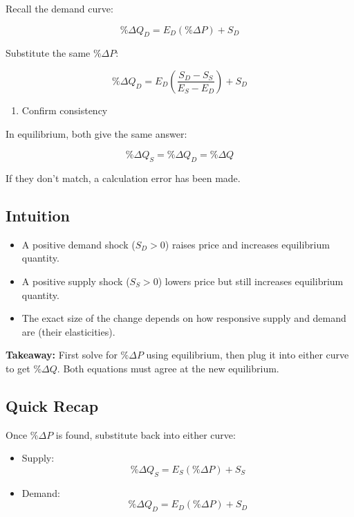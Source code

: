 \documentclass[
  letterpaper,
  DIV=11,
  numbers=noendperiod]{scrartcl}
\providecommand{\tightlist}{%
  \setlength{\itemsep}{0pt}\setlength{\parskip}{0pt}}
\begin{document}
Recall the demand curve:

\[
\% \Delta Q_D = E_D (\% \Delta P) + S_D
\]

Substitute the same \(\% \Delta P\):

\[
\% \Delta Q_D = E_D \left( \frac{S_D - S_S}{E_S - E_D} \right) + S_D
\]

\begin{enumerate}
\def\labelenumi{\arabic{enumi}.}
\setcounter{enumi}{2}
\tightlist
\item
  Confirm consistency
\end{enumerate}

In equilibrium, both give the same answer:

\[
\% \Delta Q_S = \% \Delta Q_D = \% \Delta Q
\]

If they don't match, a calculation error has been made.

\subsection{Intuition}\label{intuition-1}

\begin{itemize}
\tightlist
\item
  A positive demand shock (\(S_D > 0\)) raises price and increases
  equilibrium quantity.\\
\item
  A positive supply shock (\(S_S > 0\)) lowers price but still increases
  equilibrium quantity.\\
\item
  The exact size of the change depends on how responsive supply and
  demand are (their elasticities).
\end{itemize}

\textbf{Takeaway:} First solve for \(\% \Delta P\) using equilibrium,
then plug it into either curve to get \(\% \Delta Q\). Both equations
must agree at the new equilibrium.

\subsection{Quick Recap}\label{quick-recap}

Once \(\% \Delta P\) is found, substitute back into either curve:

\begin{itemize}
\tightlist
\item
  Supply:\\
  \[
  \% \Delta Q_S = E_S(\% \Delta P) + S_S
  \]
\item
  Demand:\\
  \[
  \% \Delta Q_D = E_D(\% \Delta P) + S_D
  \]
\end{itemize}
\end{document}
